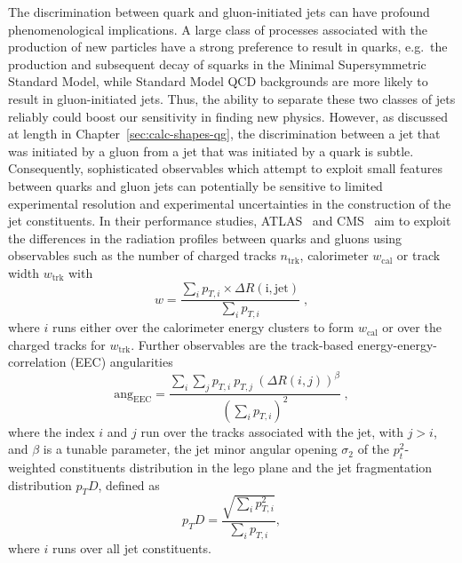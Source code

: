 The discrimination between quark and gluon-initiated jets can have profound phenomenological implications. A large class of processes associated with the production of new particles have a strong preference to result in quarks, e.g.\ the production and subsequent decay of squarks in the Minimal Supersymmetric Standard Model, while Standard Model QCD backgrounds are more likely to result in gluon-initiated jets. Thus, the ability to separate these two classes of jets reliably could boost our sensitivity in finding new physics. However, as discussed at length in Chapter~\ref{sec:calc-shapes-qg}, the discrimination between a jet that was initiated by a gluon from a jet that was initiated by a quark is subtle. 
%
Consequently, sophisticated observables which attempt to exploit small features between quarks and gluon jets can potentially be sensitive to limited experimental resolution and experimental uncertainties in the construction of the jet constituents.
%
In their performance studies, ATLAS~\cite{Aad:2014gea} and CMS~\cite{CMS:2017wyc} aim to exploit the differences in the radiation profiles between quarks and gluons using observables such as the number of charged tracks $n_{\mathrm{trk}}$, calorimeter $w_\mathrm{cal}$ or track width $w_\mathrm{trk}$ with
\begin{equation}
w = \frac{\sum_i p_{T,i} \times \Delta R\mathrm{(i,jet)}}{\sum_i p_{T,i}}\;,
\end{equation}
where $i$ runs either over the calorimeter energy clusters to form $w_\mathrm{cal}$ or over the charged tracks for $w_\mathrm{trk}$. Further observables are the track-based energy-energy-correlation (EEC) angularities
\begin{equation}
\mathrm{ang}_{\mathrm{EEC}} = \frac{\sum_i \sum_j p_{T,i} ~ p_{T,j} ~ (\Delta R(i,j))^\beta}{(\sum_i p_{T,i})^2}\;,
\end{equation}
where the index $i$ and $j$ run over the tracks associated with the jet, with $j>i$, and $\beta$ is a tunable parameter, the jet minor angular opening $\sigma_2$ of the $p_t^2$-weighted constituents distribution in the lego plane and the jet fragmentation distribution $p_{T}D$, defined as
\begin{equation}
p_{T}D = \frac{\sqrt{\sum_i p_{T,i}^2}}{\sum_i p_{T,i}},
\end{equation}
where $i$ runs over all jet constituents.
%
